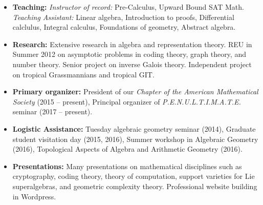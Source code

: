 \documentclass[10pt,a4paper]{article}
\begin{document}
\begin{itemize}
\item \textbf{Teaching:} \emph{Instructor of record:} Pre-Calculus, Upward Bound SAT Math. \emph{Teaching Assistant:} Linear algebra, Introduction to proofs, Differential calclulus, Integral calculus, Foundations of geometry, Abstract algebra.
\item \textbf{Research:} Extensive research in algebra and representation theory. REU in Summer 2012 on asymptotic problems in coding theory, graph theory, and number theory. Senior project on inverse Galois theory. Independent project on tropical Grassmannians and tropical GIT.
\item \textbf{Primary organizer:} President of our \emph{Chapter of the American Mathematical Society} (2015 -- present), Principal organizer of \emph{P.E.N.U.L.T.I.M.A.T.E.} seminar (2017 -- present).
\item \textbf{Logistic Assistance:} Tuesday algebraic geometry seminar (2014), Graduate student visitation day (2015, 2016), Summer workshop in Algebraic Geometry (2016), Topological Aspects of Algebra and Arithmetic Geometry (2016).
\item \textbf{Presentations:} Many presentations on mathematical disciplines such as cryptography, coding theory, theory of computation, support varieties for Lie superalgebras, and geometric complexity theory. Professional website building in Wordpress. 
\end{itemize}
\end{document}

